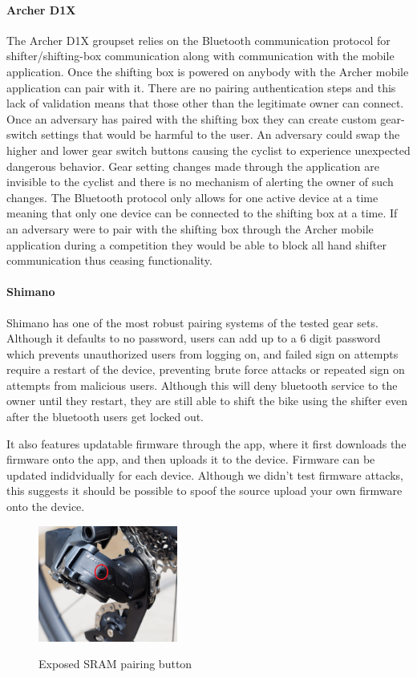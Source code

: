 \documentclass[letterpaper,twocolumn,10pt]{article}
\begin{document}
\paragraph{Archer D1X}
The Archer D1X groupset relies on the Bluetooth communication protocol for shifter/shifting-box communication along with communication with the mobile application. Once the shifting box is powered on anybody with the Archer mobile application can pair with it. There are no pairing authentication steps and this lack of validation means that those other than the legitimate owner can connect. Once an adversary has paired with the shifting box they can create custom gear-switch settings that would be harmful to the user. An adversary could swap the higher and lower gear switch buttons causing the cyclist to experience unexpected dangerous behavior. Gear setting changes made through the application are invisible to the cyclist and there is no mechanism of alerting the owner of such changes. The Bluetooth protocol only allows for one active device at a time meaning that only one device can be connected to the shifting box at a time. If an adversary were to pair with the shifting box through the Archer mobile application during a competition they would be able to block all hand shifter communication thus ceasing functionality.

\paragraph{Shimano}
Shimano has one of the most robust pairing systems of the tested gear sets. Although it defaults to no password, users can add up to a 6 digit password which prevents unauthorized users from logging on, and failed sign on attempts require a restart of the device, preventing brute force attacks or repeated sign on attempts from malicious users. Although this will deny bluetooth service to the owner until they restart, they are still able to shift the bike using the shifter even after the bluetooth users get locked out.

It also features updatable firmware through the app, where it first downloads the firmware onto the app, and then uploads it to the device. Firmware can be updated indidvidually for each device. Although we didn't test firmware attacks, this suggests it should be possible to spoof the source upload your own firmware onto the device.

\begin{figure}[ht]
  \begin{center}
    \centering
    \includegraphics[width=130pt]{images/SRAMbtn.png}
    \label{fig:srambtn}
  \end{center}
  \caption{Exposed SRAM pairing button \cite{james_sram_2021}}
\end{figure}
\end{document}
